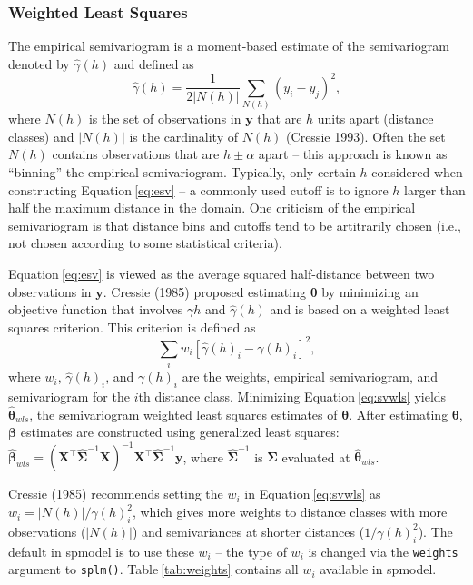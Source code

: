 \documentclass{article}
\begin{document}
\hypertarget{weighted-least-squares}{%
\subsubsection{Weighted Least Squares}\label{weighted-least-squares}}

The empirical semivariogram is a moment-based estimate of the
semivariogram denoted by \(\hat{\gamma}(h)\) and defined as
\begin{equation}\label{eq:esv}
  \hat{\gamma}(h) = \frac{1}{2|N(h)|} \sum_{N(h)} (y_i - y_j)^2, 
\end{equation} where \(N(h)\) is the set of observations in
\(\mathbf{y}\) that are \(h\) units apart (distance classes) and
\(|N(h)|\) is the cardinality of \(N(h)\) (Cressie 1993). Often the set
\(N(h)\) contains observations that are \(h \pm \alpha\) apart -- this
approach is known as ``binning'' the empirical semivariogram. Typically,
only certain \(h\) considered when constructing
Equation\(~\)\ref{eq:esv} -- a commonly used cutoff is to ignore \(h\)
larger than half the maximum distance in the domain. One criticism of
the empirical semivariogram is that distance bins and cutoffs tend to be
artitrarily chosen (i.e., not chosen according to some statistical
criteria).

Equation\(~\)\eqref{eq:esv} is viewed as the average squared
half-distance between two observations in \(\mathbf{y}\). Cressie (1985)
proposed estimating \(\bm{\theta}\) by minimizing an objective function
that involves \(\gamma{h}\) and \(\hat{\gamma}(h)\) and is based on a
weighted least squares criterion. This criterion is defined as
\begin{equation}\label{eq:svwls}
  \sum_i w_i [\hat{\gamma}(h)_i - \gamma(h)_i]^2,
\end{equation} where \(w_i\), \(\hat{\gamma}(h)_i\), and \(\gamma(h)_i\)
are the weights, empirical semivariogram, and semivariogram for the
\(i\)th distance class. Minimizing Equation\(~\)\eqref{eq:svwls} yields
\(\bm{\hat{\theta}}_{wls}\), the semivariogram weighted least squares
estimates of \(\bm{\theta}\). After estimating \(\bm{\theta}\),
\(\bm{\beta}\) estimates are constructed using generalized least
squares:
\(\bm{\hat{\beta}}_{wls} = (\mathbf{X}^\intercal \hat{\mathbf{\Sigma}}^{-1} \mathbf{X})^{-1} \mathbf{X}^\intercal \hat{\mathbf{\Sigma}}^{-1} \mathbf{y}\),
where \(\hat{\mathbf{\Sigma}}^{-1}\) is \(\mathbf{\Sigma}\) evaluated at
\(\bm{\hat{\theta}}_{wls}\).

Cressie (1985) recommends setting the \(w_i\) in
Equation\(~\)\eqref{eq:svwls} as \(w_i = |N(h)| / \gamma(h)_i^2\), which
gives more weights to distance classes with more observations
(\(|N(h)|\)) and semivariances at shorter distances
(\(1 / \gamma(h)_i^2\)). The default in spmodel is to use these \(w_i\)
-- the type of \(w_i\) is changed via the \texttt{weights} argument to
\texttt{splm()}. Table\(~\)\ref{tab:weights} contains all \(w_i\)
available in spmodel.
\end{document}
